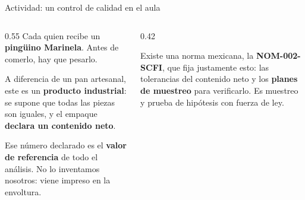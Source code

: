 %
%      
%
%
\begin{frame}{Actividad: un control de calidad en el aula}
  \begin{columns}[T]
    \begin{column}{0.55\textwidth}
      Cada quien recibe un \textbf{pingüino Marinela}. Antes de comerlo, hay que pesarlo.
      \vspace{0.3cm}

      A diferencia de un pan artesanal, este es un \textbf{producto industrial}: se
      supone que todas las piezas son iguales, y el empaque \textbf{declara un
      contenido neto}.
      \vspace{0.3cm}

      Ese número declarado es el \textbf{valor de referencia} de todo el análisis.
      No lo inventamos nosotros: viene impreso en la envoltura.
    \end{column}
    \begin{column}{0.42\textwidth}
      \vspace{0.3cm}

      {\footnotesize Existe una norma mexicana, la \textbf{NOM-002-SCFI}, que fija
      justamente esto: las tolerancias del contenido neto y los \textbf{planes de
      muestreo} para verificarlo. Es muestreo y prueba de hipótesis con fuerza de ley.}
    \end{column}
  \end{columns}
\end{frame}
